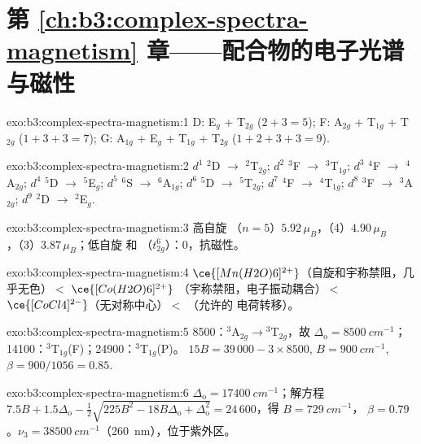 \section*{第 \ref{ch:b3:complex-spectra-magnetism} 章——配合物的电子光谱与磁性}

\begin{solution}{exo:b3:complex-spectra-magnetism:1}
D: E$_g$ + T$_{2g}$ ($2 + 3 = 5$); F: A$_{2g}$ + T$_{1g}$ + T$_{2g}$ ($1 + 3 + 3 = 7$); G: A$_{1g}$ + E$_g$ + T$_{1g}$ + T$_{2g}$
($1 + 2 + 3 + 3 = 9$).
\end{solution}

\begin{solution}{exo:b3:complex-spectra-magnetism:2}
$d^1$ $^2$D $\to$ $^2$T$_{2g}$; $d^2$ $^3$F $\to$ $^3$T$_{1g}$; $d^3$ $^4$F $\to$ $^4$A$_{2g}$; $d^4$ $^5$D $\to$ $^5$E$_g$; $d^5$ $^6$S $\to$ $^6$A$_{1g}$; $d^6$ $^5$D
$\to$ $^5$T$_{2g}$; $d^7$ $^4$F $\to$ $^4$T$_{1g}$; $d^8$ $^3$F $\to$ $^3$A$_{2g}$; $d^9$ $^2$D $\to$ $^2$E$_g$.
\end{solution}

\begin{solution}{exo:b3:complex-spectra-magnetism:3}
高自旋 （$n = 5$）$5.92\,\mu_B$，（4）$4.90\,\mu_B$，（3）$3.87\,\mu_B$；低自旋  和
（$t_{2g}^6$）：0，抗磁性。
\end{solution}

\begin{solution}{exo:b3:complex-spectra-magnetism:4}
$\ce{[Mn(H2O)6]^{2+}}$（自旋和宇称禁阻，几乎无色）$<$ $\ce{[Co(H2O)6]^{2+}}$
（宇称禁阻，电子振动耦合）$<$ $\ce{[CoCl4]^{2-}}$（无对称中心）$<$ （允许的
电荷转移）。
\end{solution}

\begin{solution}{exo:b3:complex-spectra-magnetism:5}
8500：$^3$A$_{2g}\to{}^3$T$_{2g}$，故 $\Delta_{\mathrm o} = \qty{8500}{cm^{-1}}$；14100：$^3$T$_{1g}$(F)；24900：$^3$T$_{1g}$(P)。
$15B = 39\,000 - 3 \times 8500$, $B = \qty{900}{cm^{-1}}$, $\beta = 900/1056 = 0.85$.
\end{solution}

\begin{solution}{exo:b3:complex-spectra-magnetism:6}
$\Delta_{\mathrm o} = \qty{17400}{cm^{-1}}$；解方程 $7.5B + 1.5\Delta_{\mathrm o} - \frac12\sqrt{225B^2 - 18B\Delta_{\mathrm o} + \Delta_{\mathrm o}^2} = 24\,600$，得 $B = \qty{729}{cm^{-1}}$，
$\beta = 0.79$。$\nu_3 = \qty{38500}{cm^{-1}}$（\qty{260}{nm}），位于紫外区。
\end{solution}

